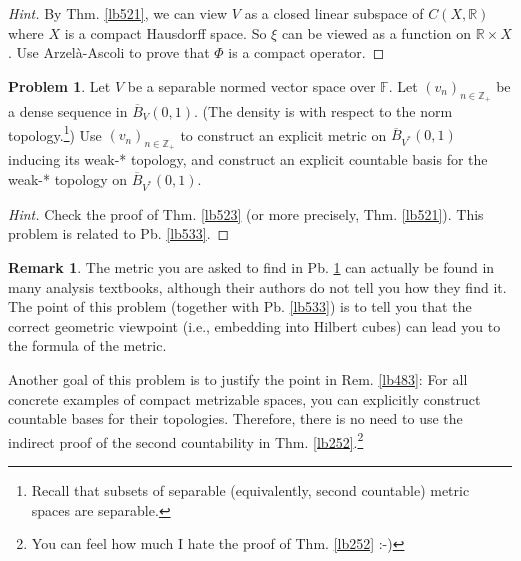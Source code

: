 \documentclass[12pt,b5paper,notitlepage]{article}
\theoremstyle{definition}
\newtheorem{exe}[df]{Exercise}
\newtheorem{rem}[df]{Remark}
\newtheorem{prob}{\color{red}Problem}[section]
\theoremstyle{plain}
\newcommand{\ovl}{\overline}
\newcommand{\Zbb}{\mathbb Z}
\newcommand{\Rbb}{\mathbb R}
\newcommand{\Fbb}{\mathbb F}
\numberwithin{equation}{section}
\begin{document}
\begin{proof}[Hint]
By Thm. \ref{lb521}, we can view $V$ as a closed linear subspace of $C(X,\Rbb)$ where $X$ is a compact Hausdorff space. So $\xi$ can be viewed as a function on $\Rbb\times X$. Use Arzel\`a-Ascoli to prove that $\Phi$ is a compact operator.
\end{proof}



\begin{prob}\label{lb535}
Let $V$ be a separable normed vector space over $\Fbb$. Let $(v_n)_{n\in\Zbb_+}$ be a dense sequence in $\ovl B_V(0,1)$. (The density is with respect to the norm topology.\footnote{Recall that subsets of separable (equivalently, second countable) metric spaces are separable.}) Use $(v_n)_{n\in\Zbb_+}$ to construct an explicit metric on $\ovl B_{V^*}(0,1)$ inducing its weak-* topology, and construct an explicit countable basis for the weak-* topology on $\ovl B_{V^*}(0,1)$.
\end{prob}

\begin{proof}[Hint]
Check the proof of Thm. \ref{lb523} (or more precisely, Thm. \ref{lb521}). This problem is related to Pb. \ref{lb533}.
\end{proof}


\begin{rem}
The metric you are asked to find in Pb. \ref{lb535} can actually be found in many analysis textbooks, although their authors do not tell you how they find it. The point of this problem (together with Pb. \ref{lb533}) is to tell you that the correct geometric viewpoint (i.e., embedding into Hilbert cubes) can lead you to the formula of the metric. 

Another goal of this problem is to justify the point in Rem. \ref{lb483}: For all concrete examples of compact metrizable spaces, you can explicitly construct countable bases for their topologies. Therefore, there is no need to use the indirect proof of the second countability in Thm. \ref{lb252}.\footnote{You can feel how much I hate the proof of Thm. \ref{lb252} :-)}  \hfill\qedsymbol
\end{rem}





\begin{comment}
\begin{exe}
Let $f:X\rightarrow Y$ be a continuous map of topological spaces. Show that if $X$ is separable, then $f(X)$ is separable. (This property is not true if ``separable" is replaced by ``second countable".)
\end{exe}
\end{comment}
\end{document}

